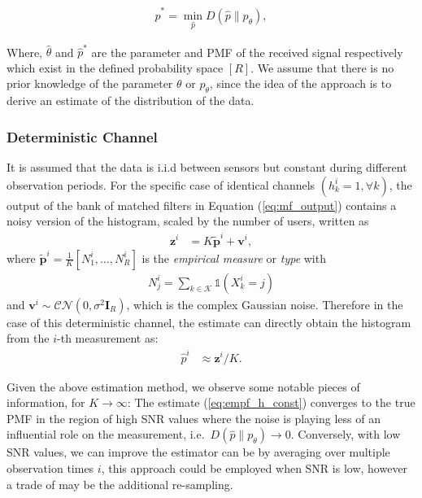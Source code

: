 \documentclass{article}
\begin{document}
\begin{align}
\hat{p}^* = \min_{\hat{p}} D(\hat{p}\|p_{\theta}),  
\end{align}

Where, $\hat{\theta}$ and $\hat{p}^*$ are the parameter and PMF of the received signal respectively which exist in the defined probability space $[R]$.  We assume that there is no prior knowledge of the parameter $\theta$ or $p_{\theta}$, since the idea of the approach is to derive an estimate of the distribution of the data.


\subsubsection{Deterministic Channel}\label{det_chan}

It is assumed that the data is i.i.d between sensors but constant during different observation periods. For the specific case of identical channels ${(h^i_k = 1, \forall k)}$, the output of the bank of matched filters in Equation (\ref{eq:mf_output}) contains a noisy version of the histogram, scaled by the number of users, written as
%
\begin{align}
    \boldsymbol{z}^i &= K \tilde{\boldsymbol{p}}^i + \boldsymbol{v}^i, 
\end{align}
%
where $\tilde{\boldsymbol{p}}^i = \frac{1}{K}[N_1^i, \ldots, N_R^i]$ is the \emph{empirical measure} or \emph{type} with
\begin{align}
    N_j^i = \sum_{k \in \mathcal{K}}\mathbb{1}(X^i_k = j)
\end{align}
and $\boldsymbol{v}^i \sim \mathcal{CN}(0, {\sigma^2 \boldsymbol{I}_R})$, which is the complex Gaussian noise.
%
Therefore in the case of this deterministic channel, the estimate can directly obtain the histogram from the $i$-th measurement as:
%
\begin{align}
    \hat{p}^i &\approx \boldsymbol{z}^i / K. \label{eq:empf_h_const}
\end{align}

Given the above estimation method, we observe some notable pieces of information, for $K \rightarrow \infty$: The estimate (\ref{eq:empf_h_const}) converges to the true PMF in the region of high SNR values where the noise is playing less of an influential role on the measurement, i.e.~$D(\hat{p}\| p_{\theta}) \rightarrow 0$. Conversely, with low SNR values, we can improve the estimator can be by averaging over multiple observation times $i$, this approach could be employed when SNR is low, however a trade of may be the additional re-sampling. 
\end{document}
